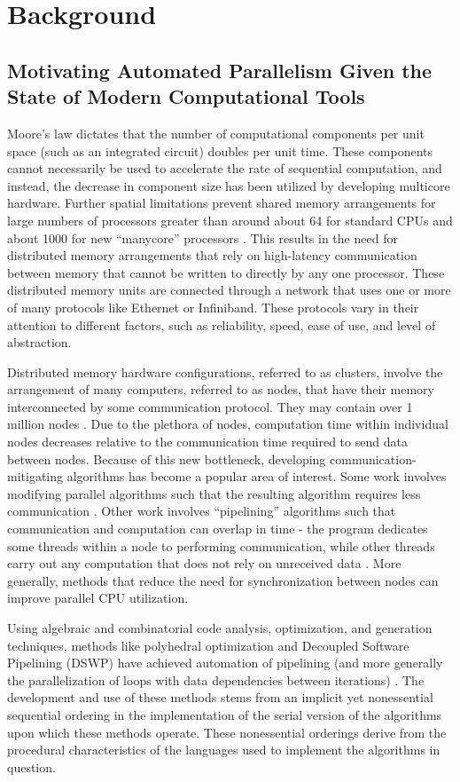 \chapter{Background}

\section{Motivating Automated Parallelism Given the State of Modern
Computational Tools}
Moore's law dictates that the number of computational components per unit space
(such as an integrated circuit) doubles per unit time. These components cannot
necessarily be used to accelerate the rate of sequential computation, and
instead, the decrease in component size has been utilized by developing
multicore hardware. Further spatial limitations prevent shared memory
arrangements for large numbers of processors greater than around about 64 for
standard CPUs and about 1000 for new ``manycore'' processors \cite{manycore}.
This results in the need for distributed memory arrangements that rely on
high-latency communication between memory that cannot be written to directly by
any one processor. These distributed memory units are connected through a
network that uses one or more of many protocols like Ethernet or Infiniband.
These protocols vary in their attention to different factors, such as
reliability, speed, ease of use, and level of abstraction.

Distributed memory hardware configurations, referred to as clusters, involve the
arrangement of many computers, referred to as nodes, that have their memory
interconnected by some communication protocol. They may contain over 1 million
nodes \cite{top500}. Due to the plethora of nodes, computation time within
individual nodes decreases relative to the communication time required to send
data between nodes. Because of this new bottleneck, developing
communication-mitigating algorithms has become a popular area of interest. Some
work involves modifying parallel algorithms such that the resulting algorithm
requires less communication \cite{strassen_comm_opt}. Other work involves
``pipelining'' algorithms such that communication and computation can overlap in
time \-- the program dedicates some threads within a node to performing
communication, while other threads carry out any computation that does not rely
on unreceived data \cite{gmres_pipe}.  More generally, methods that reduce the
need for synchronization between nodes can improve parallel CPU utilization.

Using algebraic and combinatorial code analysis, optimization, and generation
techniques, methods like polyhedral optimization and Decoupled Software
Pipelining (DSWP) have achieved automation of pipelining (and more generally the
parallelization of loops with data dependencies between iterations)
\cite{polyopt} \cite{dswp}. The development and use of these methods stems from
an implicit yet nonessential sequential ordering in the implementation of the
serial version of the algorithms upon which these methods operate. These
nonessential orderings derive from the procedural characteristics of the
languages used to implement the algorithms in question.

